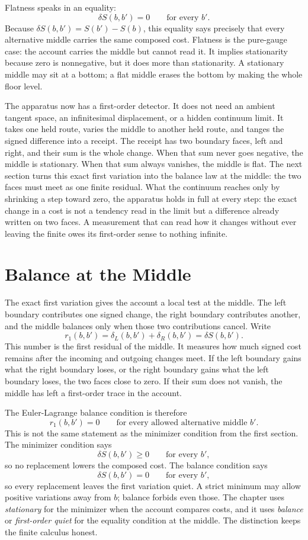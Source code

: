 Flatness speaks in an equality:
\[
  \delta S(b,b') = 0 \qquad \text{for every } b'.
\]
Because $\delta S(b,b') = S(b') - S(b)$, this equality says precisely that every alternative middle carries the same composed cost. Flatness is the pure-gauge case: the account carries the middle but cannot read it. It implies stationarity because zero is nonnegative, but it does more than stationarity. A stationary middle may sit at a bottom; a flat middle erases the bottom by making the whole floor level.

The apparatus now has a first-order detector. It does not need an ambient tangent space, an infinitesimal displacement, or a hidden continuum limit. It takes one held route, varies the middle to another held route, and tanges the signed difference into a receipt. The receipt has two boundary faces, left and right, and their sum is the whole change. When that sum never goes negative, the middle is stationary. When that sum always vanishes, the middle is flat. The next section turns this exact first variation into the balance law at the middle: the two faces must meet as one finite residual. What the continuum reaches only by shrinking a step toward zero, the apparatus holds in full at every step: the exact change in a cost is not a tendency read in the limit but a difference already written on two faces. A measurement that can read how it changes without ever leaving the finite owes its first-order sense to nothing infinite.

\section{Balance at the Middle}

The exact first variation gives the account a local test at the middle. The left boundary contributes one signed change, the right boundary contributes another, and the middle balances only when those two contributions cancel. Write
\[
  r_1(b,b') =
  \delta_L(b,b') + \delta_R(b,b')
  =
  \delta S(b,b').
\]
This number is the first residual of the middle. It measures how much signed cost remains after the incoming and outgoing changes meet. If the left boundary gains what the right boundary loses, or the right boundary gains what the left boundary loses, the two faces close to zero. If their sum does not vanish, the middle has left a first-order trace in the account.

The Euler-Lagrange balance condition is therefore
\[
  r_1(b,b') = 0
  \qquad \text{for every allowed alternative middle } b'.
\]
This is not the same statement as the minimizer condition from the first section. The minimizer condition says
\[
  \delta S(b,b') \ge 0
  \qquad \text{for every } b',
\]
so no replacement lowers the composed cost. The balance condition says
\[
  \delta S(b,b') = 0
  \qquad \text{for every } b',
\]
so every replacement leaves the first variation quiet. A strict minimum may allow positive variations away from $b$; balance forbids even those. The chapter uses \emph{stationary} for the minimizer when the account compares costs, and it uses \emph{balance} or \emph{first-order quiet} for the equality condition at the middle. The distinction keeps the finite calculus honest.

